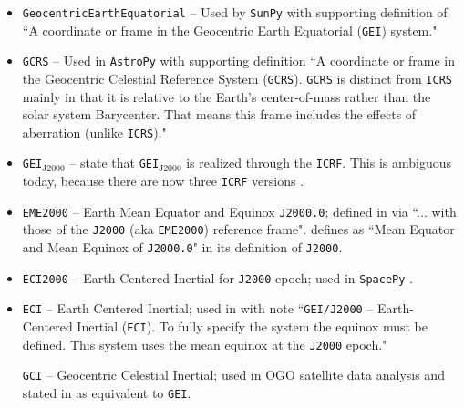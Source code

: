 \documentclass[draft]{agujournal2019}
\begin{document}
\begin{itemize}
    \item \texttt{GeocentricEarthEquatorial} -- Used by \texttt{SunPy} \cite{SunPy} with supporting definition of ``A coordinate or frame in the Geocentric Earth Equatorial (\texttt{GEI}) system."
    
    \item \texttt{GCRS} --  Used in \texttt{AstroPy} \cite{AstroPy2022} with supporting definition ``A coordinate or frame in the Geocentric Celestial Reference System (\texttt{GCRS}). \texttt{GCRS} is distinct from \texttt{ICRS} mainly in that it is relative to the Earth’s center-of-mass rather than the solar system Barycenter. That means this frame includes the effects of aberration (unlike \texttt{ICRS})."

    \item \texttt{GEI}$_\mathrm{J2000}$ --  state that \texttt{GEI}$_\mathrm{J2000}$ is realized through the \texttt{ICRF}. This is ambiguous today, because there are now three \texttt{ICRF} versions \cite{Charlot2020}.

    \item \texttt{EME2000} -- Earth Mean Equator and Equinox \texttt{J2000.0}; defined in  via ``... with those of the \texttt{J2000} (aka \texttt{EME2000}) reference frame".  defines as ``Mean Equator and Mean Equinox of \texttt{J2000.0}" in its definition of \texttt{J2000}.

    \item \texttt{ECI2000} -- Earth Centered Inertial for \texttt{J2000} epoch; used in \texttt{SpacePy} \cite{Niehof2022}.

    \item \texttt{ECI} -- Earth Centered Inertial; used in  with note ``\texttt{GEI/J2000} – Earth-Centered Inertial (\texttt{ECI}). To fully specify the system the equinox must be defined. This system uses the mean equinox at the \texttt{J2000} epoch."
    
    
    \texttt{GCI} -- Geocentric Celestial Inertial; used in OGO satellite data analysis \cite{NASA1970} and stated in  as equivalent to \texttt{GEI}.



\end{itemize}
\end{document}
